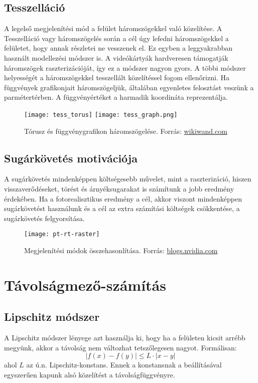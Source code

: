 \subsection{Tesszelláció}
A legelső megjelenítési mód a felület háromszögekkel való közelítése. A Tesszelláció vagy háromszögelés során a cél úgy lefedni háromszögekkel a felületet, hogy annak részletei ne vesszenek el. Ez egyben a leggyakrabban használt modellezési módszer is. A videókártyák hardveresen támogatják háromszögek raszterizációját, így ez a módszer nagyon gyors. A többi módszer helyességét a háromszögekkel tesszellált közelítéssel fogom ellenőrizni. Ha függvények grafikonjait háromszögeljük, általában egyenletes felosztást veszünk a parmétertérben. A függvényértéket a harmadik koordináta reprezentálja.
\begin{figure}[H]
	\centering
	\texttt{[image: tess\_torus]}
	\hspace{5pt}
	\texttt{[image: tess\_graph.png]}
	\caption{Tórusz és függvénygrafikon háromszögelése. Forrás: \href{https://www.wikiwand.com/en/Surface_triangulation}{wikiwand.com}}
\end{figure}

\subsection{Sugárkövetés motivációja}
A sugárkövetés mindenképpen költségesebb művelet, mint a raszterizáció, hiszen visszaverődéseket, törést és árnyéksugarakat is számítunk a jobb eredmény érdekében. Ha a fotorealisztikus eredmény a cél, akkor viszont mindenképpen sugárkövetést használunk és a cél az extra számítási költségek csökkentése, a sugárkövetés felgyorsítása. 
\begin{figure}[H]
	\centering
	\texttt{[image: pt-rt-raster]}
	\caption{Megjelenítési módok összehasonlítása. Forrás: \href{https://blogs.nvidia.com/blog/2022/03/23/what-is-path-tracing/}{blogs.nvidia.com}}
\end{figure}


\section{Távolságmező-számítás}

\subsection{Lipschitz módszer}
A Lipschitz módszer lényege azt használja ki, hogy ha a felületen kicsit arrébb megyünk, akkor a távolság nem változhat tetszőlegesen nagyot. Formálisan:
$$ |f(x)-f(y)| \le L \cdot |x-y| $$
ahol $L$ az ú.n. Lipschitz-konstans. Ennek a konstansnak a beállításával egyszerűen kapunk alsó közelítést a távolságfüggvényre.

